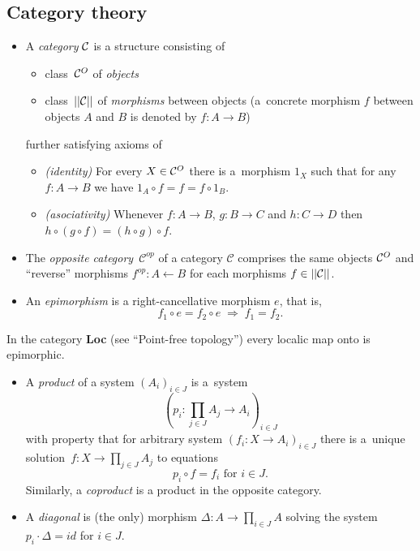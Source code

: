 \subsection*{Category theory}

\begin{itemize}
\item A \emph{category} $\mathcal{C}$ is a structure consisting of
  \begin{itemize}
  \item class~$\mathcal{C}^O$ of \emph{objects\/}
  \item class~$||\mathcal{C}||$ of \emph{morphisms\/} between objects 
  (a~concrete morphism $f$ between objects $A$ and $B$ is denoted by $f\colon A
   \to B$)
  \end{itemize}
further satisfying axioms of
  \begin{itemize}
  \item \emph{(identity)\/}
  For every $X\in \mathcal{C}^O$ there is a~morphism $1_X$ such that for any $f\colon A \to B$
  we have $1_A \circ f = f = f \circ 1_B$.
  \item \emph{(asociativity)\/}
  Whenever $f\colon A \to B$, $g\colon B \to C$ and $h\colon C \to D$ then $h
  \circ (g \circ f) = (h \circ g) \circ f$.
  \end{itemize}

\item The \emph{opposite category}~$\mathcal{C}^{op}$ of a category
$\mathcal{C}$ comprises the same objects $\mathcal{C}^O$ and ``reverse'' morphisms
$f^{op}\colon A \leftarrow B$ for each morphisms $f\in ||\mathcal{C}||$.

\item An \emph{epimorphism} is a right-cancellative morphism $e$, that is,
\[
  f_1 \circ e = f_2 \circ e \; \Longrightarrow \; f_1 = f_2.
\]
\end{itemize}

\begin{exmpl}
  In the category {\bf Loc} (see ``Point-free topology'') every localic map
  onto is epimorphic.
\end{exmpl}

\begin{itemize}
\item A \emph{product} of a system $\left(A_i\right)_{i\in J}$ is a~system
\[
  \left(p_i\colon \prod_{j\in J} A_j \to A_i \right)_{i\in J}
\]
with property that for arbitrary system $\left(f_i\colon X \to A_i\right)_{i\in
J}$ there is a~unique solution~$f\colon X \to \prod_{j\in J} A_j$ to equations
\[
  p_i \circ f = f_i \text{ for } i\in J.
\]
Similarly, a \emph{coproduct} is a product in the opposite category.

\item A \emph{diagonal} is (the only) morphism $\Delta\colon A \to \prod_{i\in
J} A$ solving the system $p_i\cdot \Delta = id$ for $i \in J$.
\end{itemize}


